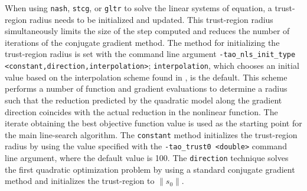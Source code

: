 When using {\tt nash}, {\tt stcg}, or {\tt gltr} to solve the linear systems 
of equation,
a trust-region radius needs to be initialized and updated.  This trust-region
radius simultaneously limits the size of the step computed and reduces the 
number of iterations of the conjugate gradient method.  The method for 
initializing the trust-region radius is set with the command line argument 
{\tt -tao\_nls\_init\_type <constant,direction,interpolation>};
{\tt interpolation}, which chooses an initial value based on the 
interpolation scheme found in \cite{CGT}, is the default.  This
scheme performs a number of function and gradient evaluations to determine 
a radius such that the reduction predicted by the quadratic model along the 
gradient direction coincides with the actual reduction in the nonlinear 
function.  The iterate obtaining the best objective function value is 
used as the starting point for the main line-search algorithm.  The 
{\tt constant} method initializes the trust-region radius by using 
the value specified with the {\tt -tao\_trust0 <double>} command line 
argument, where the default value is 100.  The {\tt direction} technique 
solves the first quadratic optimization problem by using a standard 
conjugate gradient method and initializes the trust-region to 
$\|s_0\|$.

